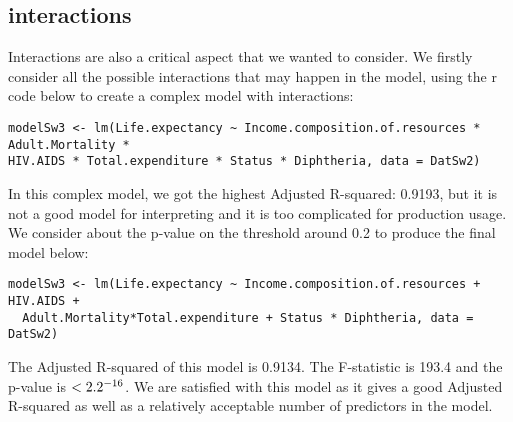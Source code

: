 \subsection{interactions}

Interactions are also a critical aspect that we wanted to consider. We firstly consider all the possible interactions that may happen in the model, using the r code below to create a complex model with interactions:

\begin{verbatim}
modelSw3 <- lm(Life.expectancy ~ Income.composition.of.resources * Adult.Mortality * 
HIV.AIDS * Total.expenditure * Status * Diphtheria, data = DatSw2)
\end{verbatim}
In this complex model, we got the highest Adjusted R-squared: 0.9193, but it is not a good model for interpreting and it is too complicated for production usage. We consider about the p-value on the threshold around 0.2 to produce the final model below:

\begin{verbatim}
modelSw3 <- lm(Life.expectancy ~ Income.composition.of.resources + HIV.AIDS + 
  Adult.Mortality*Total.expenditure + Status * Diphtheria, data = DatSw2)
\end{verbatim}
The Adjusted R-squared of this model is 0.9134. The F-statistic is 193.4 and the p-value is $< 2.2\time 10^{-16}$. We are satisfied with this model as it gives a good Adjusted R-squared as well as a relatively acceptable number of predictors in the model.

